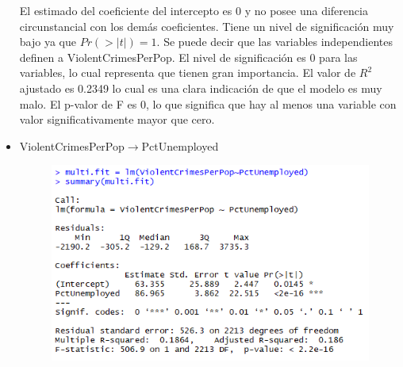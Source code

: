 \documentclass[a4paper,10pt,twocolumn]{article}
\begin{document}
\begin{itemize}
	El estimado del coeficiente del intercepto es 0 y no posee una diferencia circunstancial con los demás coeficientes. Tiene un nivel de significación muy bajo ya que $Pr(> | t | ) =1$.
	Se puede decir que las variables independientes definen a ViolentCrimesPerPop. El nivel de significación es 0 para las variables, lo cual representa que tienen gran importancia. El valor de $R^2$ ajustado es 0.2349 lo cual es una clara indicación de que el modelo es muy malo. El p-valor de F es 0, lo que significa que hay al menos una variable con valor significativamente mayor que cero.

	\item{ViolentCrimesPerPop$\rightarrow$PctUnemployed}
			
			
			
			
			
		\begin{figure}[H]
			\begin{center}
				\includegraphics[width=.92\columnwidth,right]{figures/multifit3.png}
			\end{center}
		\end{figure}


\end{itemize}
\end{document}
